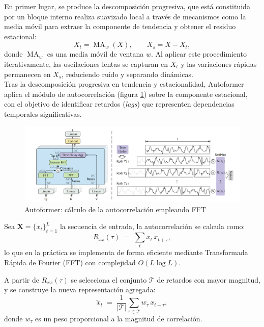 En primer lugar, se produce la descomposición progresiva, que está constituida por un bloque interno realiza suavizado local a través de mecanismos como la media móvil para extraer la componente de tendencia y obtener el residuo estacional:
\[
X_t = \operatorname{MA}_w(X), \qquad X_s = X - X_t,
\]
donde \(\operatorname{MA}_w\) es una media móvil de ventana \(w\). Al aplicar este procedimiento iterativamente, las oscilaciones lentas se capturan en \(X_t\) y las variaciones rápidas permanecen en \(X_s\), reduciendo ruido y separando dinámicas.\\

Tras la descomposición progresiva en tendencia y estacionalidad, Autoformer aplica el módulo de autocorrelación (figura \ref{autocorrelacion}) sobre la componente estacional, con el objetivo de identificar retardos (\textit{lags}) que representen dependencias temporales significativas.

\begin{figure}[!ht]
	\centering
	\includegraphics[scale=0.25]{img/autocorrelacion.png}
	\caption{Autoformer: cálculo de la autocorrelación empleando FFT~\cite{wu2022autoformerdecompositiontransformersautocorrelation}}
	\label{autocorrelacion}
\end{figure}

Sea $\mathbf{X} = \{x_t\}_{t=1}^L$ la secuencia de entrada, la autocorrelación se calcula como:
\begin{equation}
	R_{xx}(\tau) \;=\; \sum_{t} x_t \, x_{t+\tau},
\end{equation}
lo que en la práctica se implementa de forma eficiente mediante Transformada Rápida de Fourier (FFT) con complejidad $O(L \log L)$.

A partir de $R_{xx}(\tau)$ se selecciona el conjunto $\mathcal{T}$ de retardos con mayor magnitud, y se construye la nueva representación agregada:
\begin{equation}
	\tilde{x}_t \;=\; \frac{1}{|\mathcal{T}|} \sum_{\tau \in \mathcal{T}} w_\tau \, x_{t-\tau},
\end{equation}
donde $w_\tau$ es un peso proporcional a la magnitud de correlación.\\

